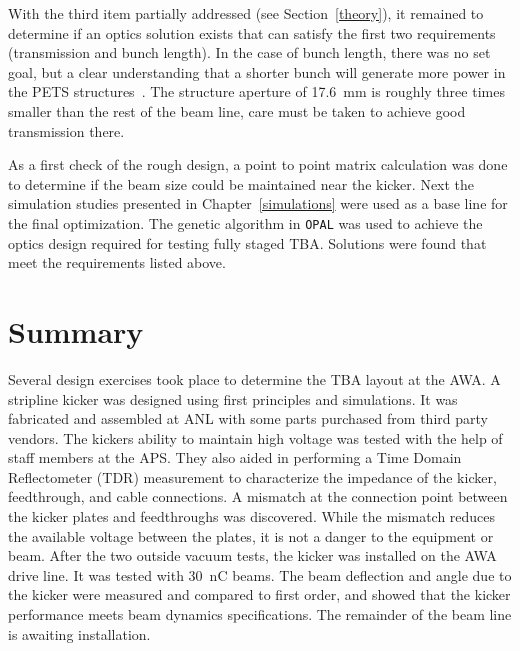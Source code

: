 \documentclass[aps,prab,preprint,groupedaddress,linenumbers]{revtex4-2}
\begin{document}
With the third item partially addressed (see Section~\ref{theory}), 
it remained to determine if an optics solution exists that can satisfy the 
first two requirements (transmission and bunch length). 
In the case of bunch length, there was no set goal, but a clear understanding 
that a shorter bunch will generate more power in the PETS structures~\cite{recent-tba}. 
The structure aperture of \SI{17.6}{mm} is roughly three times smaller than the rest of the beam line, 
care must be taken to achieve good transmission there.

As a first check of the rough design, a point to point matrix calculation was done 
to determine if the beam size could be maintained near the kicker.
Next the simulation studies presented in Chapter~\ref{simulations} were used as a  
base line for the final optimization. The genetic algorithm in \verb|OPAL|
was used to achieve the optics design required for testing fully staged TBA. 
Solutions were found that meet the requirements listed above.






\section{Summary}

Several design exercises took place to determine the TBA layout at the AWA. 
A stripline kicker was designed using first principles and simulations. 
It was fabricated and assembled at ANL with some parts purchased from third party vendors.
The kickers ability to maintain high voltage was tested with the help of staff members at the APS.
They also aided  in performing a Time Domain Reflectometer (TDR) measurement to characterize 
the impedance of the kicker, feedthrough, and cable connections. 
A mismatch at the connection point between the kicker plates and feedthroughs was discovered.
While the mismatch reduces the available voltage between the plates, it is not a danger to 
the equipment or beam. After the two outside vacuum tests, the kicker was installed on 
the AWA drive line. It was tested with \SI{30}{nC} beams. 
The beam deflection and angle due to the kicker were measured and 
compared to first order, and showed that the kicker performance meets beam dynamics specifications. 
The remainder of the beam line is awaiting installation. 
\end{document}
